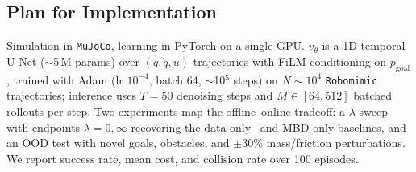 \documentclass[conference]{IEEEtran}
\begin{document}
\subsection{Plan for Implementation}


Simulation in \texttt{MuJoCo}, learning in PyTorch on a single GPU.
$v_\theta$ is a 1D temporal U-Net ($\sim$5\,M params) over
$(q,\dot q,u)$ trajectories with FiLM conditioning on
$p_{\mathrm{goal}}$, trained with Adam (lr $10^{-4}$, batch 64,
$\sim$10$^5$ steps) on $N\!\sim\!10^4$ \texttt{Robomimic} trajectories;
inference uses $T\!=\!50$ denoising steps and $M\!\in\![64,512]$
batched rollouts per step. Two experiments map the offline--online
tradeoff: a $\lambda$-sweep with endpoints $\lambda\!=\!0,\infty$
recovering the data-only~\cite{janner2022,flowmp} and MBD-only
baselines, and an OOD test with novel goals, obstacles, and $\pm
30\%$ mass/friction perturbations. We report success rate, mean
cost, and collision rate over 100 episodes.



\end{document}
